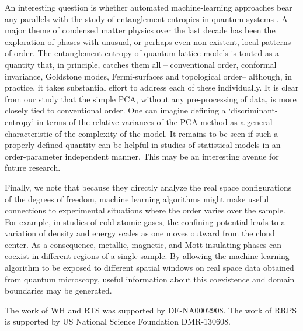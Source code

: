 \documentclass[pra,letterpaper,10pt,twocolumn]{revtex4}
\begin{document}
An interesting question is whether automated machine-learning approaches
bear any parallels with the study of entanglement entropies in quantum
systems \cite{entanglement, Sarma}.
A major theme of condensed matter physics over the last decade has been
the exploration of phases with unusual, or perhaps even non-existent,
local patterns of order.  The entanglement entropy\cite{Osborne,
Calabrese, Cincio} of quantum lattice models is touted as a quantity
that, in principle, catches them all -- conventional order, conformal
invariance, Goldstone modes, Fermi-surfaces and topological order--
although, in practice, it takes substantial effort to address each of
these individually. It is clear from our study that the simple PCA,
without any pre-processing of data, is more closely tied to conventional
order. One can imagine defining a `discriminant-entropy' in terms of
the relative variances of the PCA method as a general characteristic of
the complexity of the model. It remains to be seen if such a properly
defined quantity can be helpful in studies of statistical models in an
order-parameter independent manner. This may be an interesting avenue
for future research.

Finally, we note that because they directly analyze the real
space configurations of the degrees of freedom, machine learning
algorithms might make useful connections to experimental
situations where the order varies over the sample.
For example, in studies of cold atomic gases, the confining
potential leads to a variation of density and energy scales
as one moves outward from the cloud center.  As a consequence,
metallic, magnetic, and Mott insulating phases can coexist in 
different regions of a single sample.  By allowing the machine learning
algorithm to be exposed to different spatial windows on real space data obtained from quantum microscopy\cite{Haller_Hudson, Bakr_Gillen, Sherson_Weitenberg}, useful
information about this coexistence and domain boundaries may be generated.

\begin{acknowledgements}
The work of WH and RTS was supported by DE-NA0002908.
The work of RRPS is supported by US National Science Foundation DMR-130608.
\end{acknowledgements}
\end{document}

